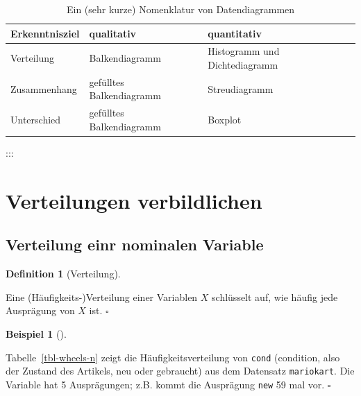 \documentclass[
  letterpaper,
  oneside,
  open=any]{scrbook}
\theoremstyle{definition}
\theoremstyle{definition}
\newtheorem{example}{Beispiel}[chapter]
\theoremstyle{definition}
\newtheorem{definition}{Definition}[chapter]
\theoremstyle{remark}
\begin{document}
\begin{longtable}[]{@{}
  >{\raggedright\arraybackslash}p{}
  >{\raggedright\arraybackslash}p{}
  >{\raggedright\arraybackslash}p{}@{}}

\caption{\label{tbl-nom-plots}Ein (sehr kurze) Nomenklatur von
Datendiagrammen}

\tabularnewline

\toprule\noalign{}
\begin{minipage}[b]{\linewidth}\raggedright
Erkenntnisziel
\end{minipage} & \begin{minipage}[b]{\linewidth}\raggedright
qualitativ
\end{minipage} & \begin{minipage}[b]{\linewidth}\raggedright
quantitativ
\end{minipage} \\
\midrule\noalign{}
\endhead
\bottomrule\noalign{}
\endlastfoot
Verteilung & Balkendiagramm & Histogramm und Dichtediagramm \\
Zusammenhang & gefülltes Balkendiagramm & Streudiagramm \\
Unterschied & gefülltes Balkendiagramm & Boxplot \\

\end{longtable}

:::

\section{Verteilungen verbildlichen}\label{verteilungen-verbildlichen}

\subsection{Verteilung einr nominalen
Variable}\label{verteilung-einr-nominalen-variable}

\begin{definition}[Verteilung]\protect\hypertarget{def-verteilung}{}\label{def-verteilung}

Eine (Häufigkeits-)Verteilung einer Variablen \(X\) schlüsselt auf, wie
häufig jede Ausprägung von \(X\) ist. \(\square\)

\end{definition}

\begin{example}[]\protect\hypertarget{exm-verteilung1}{}\label{exm-verteilung1}

Tabelle~\ref{tbl-wheels-n} zeigt die Häufigkeitsverteilung von
\texttt{cond} (condition, also der Zustand des Artikels, neu oder
gebraucht) aus dem Datensatz \texttt{mariokart}. Die Variable hat 5
Ausprägungen; z.B. kommt die Ausprägung \texttt{new} 59 mal vor.
\(\square\)

\end{example}
\end{document}
